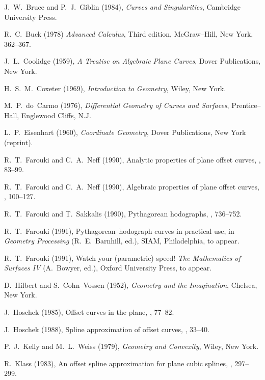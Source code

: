 \begin{thebibliography}{99}

J.~W.~Bruce and P.~J.~Giblin (1984), {\it Curves and Singularities},
Cambridge University Press.

R.~C.~Buck (1978) {\it Advanced Calculus}, Third edition, McGraw--Hill,
New York, 362--367.

J.~L.~Coolidge (1959), {\it A Treatise on Algebraic Plane Curves},
Dover Publications, New York.

H.~S.~M.~Coxeter (1969), {\it Introduction to Geometry}, Wiley,
New York.

M.~P.~do~Carmo (1976), {\it Differential Geometry of Curves and
Surfaces}, Prentice--Hall, Englewood Cliffs, N.J.

L.~P.~Eisenhart (1960), {\it Coordinate Geometry}, Dover Publications,
New York (reprint).

R.~T.~Farouki and C.~A.~Neff (1990), Analytic properties of plane
offset curves, , 83--99.

R.~T.~Farouki and C.~A.~Neff (1990), Algebraic properties of plane
offset curves, , 100--127.

R.~T.~Farouki and T.~Sakkalis (1990), Pythagorean hodographs,
, 736--752.

R.~T.~Farouki (1991), Pythagorean--hodograph curves in practical
use, in {\it Geometry Processing\/} (R.~E.~Barnhill, ed.), SIAM,
Philadelphia, to appear.

R.~T.~Farouki (1991), Watch your (parametric) speed! {\it The
Mathematics of Surfaces IV\/} (A.~Bowyer, ed.), Oxford University
Press, to appear.

D.~Hilbert and S.~Cohn--Vossen (1952),
{\it Geometry and the Imagination},
Chelsea, New York.

J.~Hoschek (1985), Offset curves in the plane, , 77--82.

J.~Hoschek (1988), Spline approximation of offset curves, ,
33--40.

P.~J.~Kelly and M.~L.~Weiss (1979), {\it Geometry and Convexity}, Wiley,
New York.

R.~Klass (1983), An offset spline approximation for plane cubic
splines, , 297--299.


\end{thebibliography}
